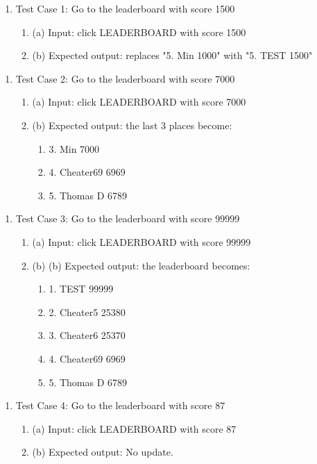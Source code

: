 \documentclass[11pt]{article}
\begin{document}
    \begin{enumerate}
        \item Test Case 1: Go to the leaderboard with score 1500
        \begin{enumerate}
            \item (a) Input: click LEADERBOARD with score 1500
            \item (b) Expected output: replaces "5. Min 1000" with "5. TEST 1500"
        \end{enumerate}
    \end{enumerate}
    \begin{enumerate}
        \item Test Case 2: Go to the leaderboard with score 7000
        \begin{enumerate}
            \item (a) Input: click LEADERBOARD with score 7000
            \item (b) Expected output: the last 3 places become: 
            \begin{enumerate}
                \item 3. Min       7000
                \item 4. Cheater69 6969
                \item 5. Thomas D  6789
            \end{enumerate}
        \end{enumerate}
    \end{enumerate}
    \begin{enumerate}
        \item Test Case 3: Go to the leaderboard with score 99999
        \begin{enumerate}
            \item (a) Input: click LEADERBOARD with score 99999
            \item (b) (b) Expected output: the leaderboard becomes:
            \begin{enumerate}
                \item 1. TEST     99999
                \item 2. Cheater5 25380
                \item 3. Cheater6 25370
                \item 4. Cheater69 6969
                \item 5. Thomas D  6789
            \end{enumerate}
        \end{enumerate}
    \end{enumerate}
    \begin{enumerate}
        \item Test Case 4: Go to the leaderboard with score 87
        \begin{enumerate}
            \item (a) Input: click LEADERBOARD with score 87
            \item (b) Expected output: No update.
        \end{enumerate}
    \end{enumerate}
\end{document}
